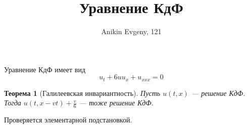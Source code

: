 \documentclass{article}
\title{Уравнение КдФ}
\author{Anikin Evgeny, 121}
\newtheorem{theorem}{Теорема}
\begin{document}
\maketitle
	\noindent Уравнение КдФ имеет вид
	\begin{equation}
		u_t + 6uu_x + u_{xxx} = 0
	\end{equation}
	\begin{theorem}[Галилеевская инвариантность]
		Пусть $u(t,x)$ --- решение КдФ. Тогда $u(t, x - vt) + \frac{v}{6}$ --- 
		тоже решение КдФ.
	\end{theorem}
	Проверяется элементарной подстановкой.
\end{document}
